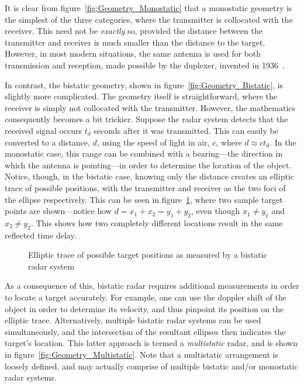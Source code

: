 \documentclass[class=report,11pt,crop=false]{standalone}
\begin{document}
It is clear from figure~\ref{fig:Geometry_Monostatic} that a monostatic geometry is the simplest of the three categories, where the transmitter is collocated with the receiver. This need not be \emph{exactly} so, provided the distance between the transmitter and receiver is much smaller than the distance to the target. However, in most modern situations, the same antenna is used for both transmission and reception, made possible by the duplexer, invented in 1936~\cite{kuschel-hagan-history}.

In contrast, the bistatic geometry, shown in figure~\ref{fig:Geometry_Bistatic}, is slightly more complicated. The geometry itself is straightforward, where the receiver is simply not collocated with the transmitter. However, the mathematics consequently becomes a bit trickier. Suppose the radar system detects that the received signal occurs \(t_d\) seconds after it was transmitted. This can easily be converted to a distance, \(d\), using the speed of light in air, \(c\), where \(d \approx ct_d\). In the monostatic case, this range can be combined with a bearing---the direction in which the antenna is pointing---in order to determine the location of the object. Notice, though, in the bistatic case, knowing only the distance creates an elliptic trace of possible positions, with the transmitter and receiver as the two foci of the ellipse respectively. This can be seen in figure~\ref{fig:Elliptic_Curve}, where two sample target points are shown---notice how \(d = x_1 + x_2 = y_1 + y_2\), even though \(x_1 \ne y_1\) and \(x_2 \ne y_2\). This shows how two completely different locations result in the same reflected time delay.

\begin{figure}
    \centering
    \def\svgwidth{0.7\linewidth}
    { %
        }
    \caption{Elliptic trace of possible target positions as measured by a bistatic radar system}
    \label{fig:Elliptic_Curve}
\end{figure}

As a consequence of this, bistatic radar requires additional measurements in order to locate a target accurately. For example, one can use the doppler shift of the object in order to determine its velocity, and thus pinpoint its position on the elliptic trace. Alternatively, multiple bistatic radar systems can be used simultaneously, and the intersection of the resultant ellipses then indicates the target's location. This latter approach is termed a \emph{multistatic} radar, and is shown in figure~\ref{fig:Geometry_Multistatic}. Note that a multistatic arrangement is loosely defined, and may actually comprise of multiple bistatic and/or monostatic radar systems.
\end{document}
